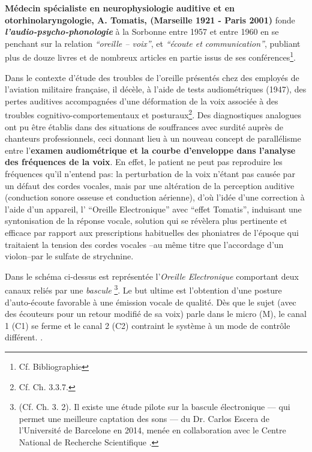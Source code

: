 \textbf{Médecin spécialiste en neurophysiologie auditive et en
oto\-rhino\-la\-ryn\-go\-lo\-gie, A. Tomatis, (Marseille 1921 - Paris 2001) } fonde
\textit{\textbf{l'audio-psycho-phonologie }} à la Sorbonne entre
1957 et entre 1960 en  se penchant sur la relation
\textit{``oreille -- voix''}, et  \textit{``écoute
et communication''}, publiant plus de douze livres et de nombreux
articles en partie issus de ses
conférences\footnote{Cf. Bibliographie}.


Dans le contexte d'étude des troubles de
l'oreille présentés chez des employés de l'aviation militaire
française, il décèle, à l'aide
de tests audiométriques
 (1947), des pertes auditives accompagnées d'une
déformation de la voix associée à des troubles
cognitivo-comportementaux et posturaux\footnote{Cf. Ch. 3.3.7.}.
Des diagnostiques analogues ont pu être établis dans des situations
de souffrances avec surdité auprès de chanteurs professionnels,
ceci donnant lieu
à un nouveau concept de
parallélisme entre l'\textbf{examen audiométrique et la courbe
d'enveloppe dans l'analyse des fréquences de la voix}.
En effet, le patient ne peut pas reproduire les fréquences qu'il
n'entend pas:
la perturbation de la voix n'étant pas causée par un défaut des cordes
vocales, mais par une altération de la perception auditive (conduction
sonore osseuse et conduction aérienne), d'où
l'idée d'une correction à l'aide d'un appareil, l' ``Oreille
Electronique'' avec ``effet Tomatis'', induisant
une syntonisation de la réponse vocale, solution qui se révèlera plus pertinente et efficace par rapport aux prescriptions habituelles des phoniatres de
l'époque qui traitaient la tension des cordes vocales --au même titre que
l'accordage d'un violon--par le sulfate de
strychnine.

Dans le schéma ci-dessus est représentée l'\textit{Oreille Electronique}
comportant deux canaux reliés par une
\textit{bascule} \footnote{(Cf. Ch. 3. 2). Il existe une étude pilote sur la bascule électronique   ---  qui permet
une meilleure
captation des sons  --- du Dr. Carlos Escera
de l'Université de Barcelone en 2014, menée en collaboration avec le
Centre National de Recherche Scientifique
\autocite{escera-key}.}.
Le but ultime est l'obtention d'une posture d'auto-écoute favorable à une
          émission vocale de qualité.
Dès que le sujet (avec
des écouteurs pour un retour modifié de sa voix) parle
dans le micro (M), le canal 1 (C1) se ferme et  le canal 2 (C2) contraint le
système à un mode de contrôle différent.
.


